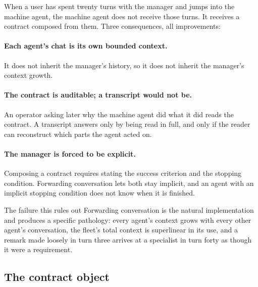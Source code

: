 \documentclass[11pt]{article}
\begin{document}
When a user has spent twenty turns with the manager and jumps into the machine agent, the machine agent does not receive those turns. It receives a contract composed from them. Three consequences, all improvements:

\paragraph{Each agent's chat is its own bounded context.} It does not inherit the manager's history, so it does not inherit the manager's context growth.

\paragraph{The contract is auditable; a transcript would not be.} An operator asking later why the machine agent did what it did reads the contract. A transcript answers only by being read in full, and only if the reader can reconstruct which parts the agent acted on.

\paragraph{The manager is forced to be explicit.} Composing a contract requires stating the success criterion and the stopping condition. Forwarding conversation lets both stay implicit, and an agent with an implicit stopping condition does not know when it is finished.

\begin{cautionbox}{The failure this rules out}
Forwarding conversation is the natural implementation and produces a specific pathology: every agent's context grows with every other agent's conversation, the fleet's total context is superlinear in its use, and a remark made loosely in turn three arrives at a specialist in turn forty as though it were a requirement.
\end{cautionbox}

\subsection{The contract object}
\end{document}

